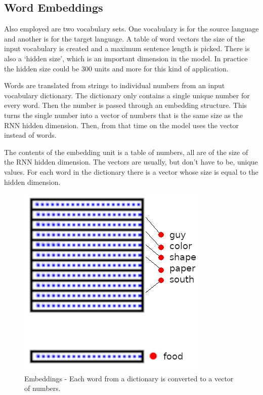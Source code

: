 \subsection{Word Embeddings}

Also employed are two vocabulary sets. One vocabulary is for the source language and another is for the target language. A table of word vectors the size of the input vocabulary is created and a maximum sentence length is picked. There is also a `hidden size', which is an important dimension in the model. In practice the hidden size could be 300 units and more for this kind of application.

Words are translated from strings to individual numbers from an input vocabulary dictionary. The dictionary only contains a single unique number for every word. Then the number is passed through an embedding structure. This turns the single number into a vector of numbers that is the same size as the RNN hidden dimension. Then, from that time on the model uses the vector instead of words.

The contents of the embedding unit is a table of numbers, all are of the size of the RNN hidden dimension. The vectors are usually, but don\textquoteright t have to be, unique values. For each word in the dictionary there is a vector whose size is equal to the hidden dimension.

\begin{figure}[H]
	\begin{center}
		\includegraphics[scale=0.5]{diagram-embedding}
		
		
	\end{center}
	\caption[Word Embeddings]{Embeddings - Each word from a dictionary is converted to a vector of numbers.}
	

\end{figure}

